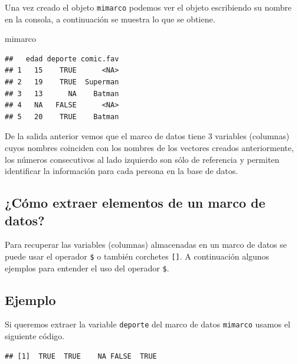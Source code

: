 \documentclass[10pt,]{krantz}
\makeatletter
\newenvironment{Shaded}{\begin{snugshade}}{\end{snugshade}}
\newcommand{\CommentTok}[1]{\textcolor[rgb]{0.56,0.35,0.01}{\textit{{#1}}}}
\newcommand{\NormalTok}[1]{{#1}}
\newenvironment{kframe}{%
\medskip{}
\setlength{\fboxsep}{.8em}
 \def\at@end@of@kframe{}%
 \ifinner\ifhmode%
  \def\at@end@of@kframe{\end{minipage}}%
  \begin{minipage}{\columnwidth}%
 \fi\fi%
 \def\FrameCommand##1{\hskip\@totalleftmargin \hskip-\fboxsep
 \colorbox{shadecolor}{##1}\hskip-\fboxsep
     \hskip-\linewidth \hskip-\@totalleftmargin \hskip\columnwidth}%
 \MakeFramed {\advance\hsize-\width
   \@totalleftmargin\z@ \linewidth\hsize
   \@setminipage}}%
 {\par\unskip\endMakeFramed%
 \at@end@of@kframe}
\renewenvironment{Shaded}{\begin{kframe}}{\end{kframe}}
\makeatother
\begin{document}
Una vez creado el objeto \texttt{mimarco} podemos ver el objeto
escribiendo su nombre en la consola, a continuación se muestra lo que se
obtiene.

\begin{Shaded}
\begin{Highlighting}[]
\NormalTok{mimarco}
\end{Highlighting}
\end{Shaded}

\begin{verbatim}
##   edad deporte comic.fav
## 1   15    TRUE      <NA>
## 2   19    TRUE  Superman
## 3   13      NA    Batman
## 4   NA   FALSE      <NA>
## 5   20    TRUE    Batman
\end{verbatim}

De la salida anterior vemos que el marco de datos tiene 3 variables
(columnas) cuyos nombres coinciden con los nombres de los vectores
creados anteriormente, los números consecutivos al lado izquierdo son
sólo de referencia y permiten identificar la información para cada
persona en la base de datos.

\subsection{¿Cómo extraer elementos de un marco de
datos?}\label{como-extraer-elementos-de-un-marco-de-datos}

Para recuperar las variables (columnas) almacenadas en un marco de datos
se puede usar el operador \texttt{\$} o también corchetes
\texttt{{[}{]}}. A continuación algunos ejemplos para entender el uso
del operador \texttt{\$}.

\subsection*{Ejemplo}\label{ejemplo-3}


Si queremos extraer la variable \texttt{deporte} del marco de datos
\texttt{mimarco} usamos el siguiente código.

\begin{Shaded}
\end{Shaded}

\begin{verbatim}
## [1]  TRUE  TRUE    NA FALSE  TRUE
\end{verbatim}
\end{document}
